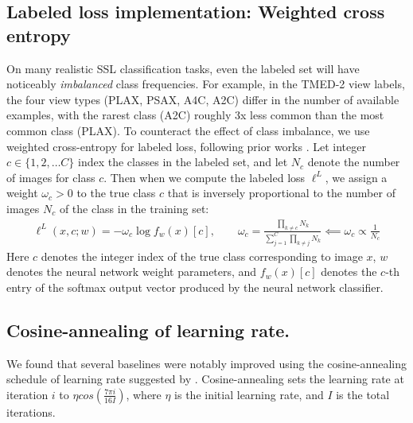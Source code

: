 \subsection{Labeled loss implementation: Weighted cross entropy}

On many realistic SSL classification tasks, even the labeled set will have noticeably \emph{imbalanced} class frequencies.
For example, in the TMED-2 view labels, the four view types (PLAX, PSAX, A4C, A2C) differ in the number of available examples, with the rarest class (A2C) roughly 3x less common than the most common class (PLAX).
To counteract the effect of class imbalance, we use weighted cross-entropy for labeled loss, following prior works \citep{huangNewSemisupervisedLearning2021,wu2021reducing}. 
Let integer $c \in \{1, 2, \ldots C\}$ index the classes in the labeled set, and let $N_c$ denote the  number of images for class $c$.
Then when we compute the labeled loss $\ell^L$, we assign a weight $\omega_c > 0$ to the true class $c$ that is inversely proportional to the number of images $N_c$ of the class in the training set:
\begin{align}
\ell^L(x, c; w) = - \omega_c \log f_w(x)[c],
\qquad 
\omega_c = \frac{\prod_{k\neq c}{N_{k}}}{\sum_{j=1}^C\prod_{k \neq j}{N_{k}}}
\impliedby
\omega_c \propto \frac{1}{N_c}
\end{align}
Here $c$ denotes the integer index of the true class corresponding to image $x$, $w$ denotes the neural network weight parameters, and $f_w(x)[c]$ denotes the $c$-th entry of the softmax output vector produced by the neural network classifier.


\subsection{Cosine-annealing of learning rate.}
We found that several baselines were notably improved using the cosine-annealing schedule of learning rate suggested by \citep{sohnFixMatchSimplifyingSemisupervised2020}.
Cosine-annealing sets the learning rate at iteration $i$ to $\eta cos(\frac{7\pi i}{16 I})$, where $\eta$ is the initial learning rate, and $I$ is the total iterations.

